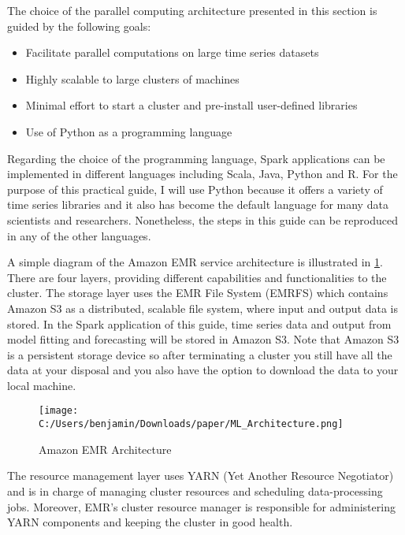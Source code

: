 \documentclass[11pt]{article}
\begin{document}
The choice of the parallel computing architecture presented in this section is guided by the following goals:

 \begin{itemize}
  \item Facilitate parallel computations on large time series datasets
  \item Highly scalable to large clusters of machines
  \item Minimal effort to start a cluster and pre-install user-defined libraries
  \item Use of Python as a programming language
 \end{itemize}

Regarding the choice of the programming language, Spark applications can be implemented in different languages including Scala, Java, Python and R. For the purpose of this practical guide, I will use Python because it offers a variety of time series libraries and it also has become the default language for many data scientists and researchers. Nonetheless, the steps in this guide can be reproduced in any of the other languages.

A simple diagram of the Amazon EMR service architecture is illustrated in \cref{fig:parallel_computing_ architecture}. There are four layers, providing different capabilities and functionalities to the cluster. The storage layer uses the EMR File System (EMRFS) which contains Amazon S3 as a distributed, scalable file system, where input and output data is stored. In the Spark application of this guide, time series data and output from model fitting and forecasting will be stored in Amazon S3. Note that Amazon S3 is a persistent storage device so after terminating a cluster you still have all the data at your disposal and you also have the option to download the data to your local machine.  

\begin{figure}[H]
    \centering
    \caption{Amazon EMR Architecture}
	\label{fig:parallel_computing_ architecture}
\texttt{[image: C:/Users/benjamin/Downloads/paper/ML\_Architecture.png]}
\end{figure}

The resource management layer uses YARN (Yet Another Resource Negotiator) and is in charge of managing cluster resources and scheduling data-processing jobs. Moreover, EMR's cluster resource manager is responsible for administering YARN components and keeping the cluster in good health. 
\end{document}
